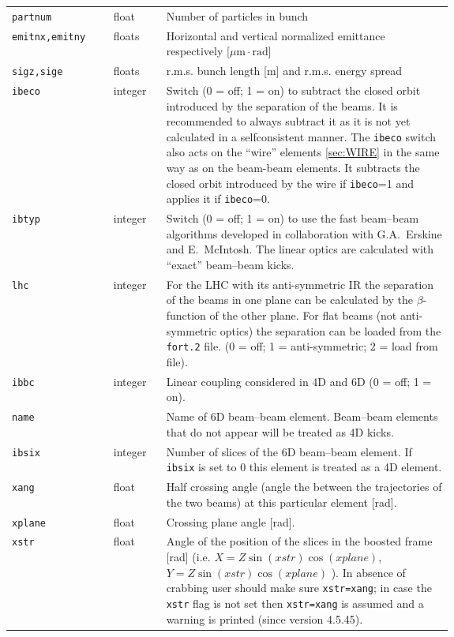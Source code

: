 \bigskip
\begin{longtabu}{@{}llp{0.65\linewidth}}
    \texttt{partnum}       & float   & Number of particles in bunch \\
    \texttt{emitnx,emitny} & floats  & Horizontal and vertical normalized emittance respectively [$\mu \mbox{m}\cdot\mbox{rad}$] \\
    \texttt{sigz,sige}     & floats  & r.m.s. bunch length [m] and r.m.s. energy spread \\
    \texttt{ibeco}         & integer & Switch (0 = off; 1 = on) to subtract the closed orbit introduced by the separation of the beams. It is recommended to always subtract it as it is not yet calculated in a selfconsistent manner. The \texttt{ibeco} switch also acts on the ``wire'' elements \ref{sec:WIRE} in the same way as on the beam-beam elements. It subtracts the closed orbit introduced by the wire if \texttt{ibeco}=1 and applies it if \texttt{ibeco}=0. \\
    \texttt{ibtyp}         & integer & Switch (0 = off; 1 = on) to use the fast beam--beam algorithms developed in collaboration with G.A.~Erskine and E.~McIntosh.  The linear optics are calculated with ``exact'' beam--beam kicks. \\
    \texttt{lhc}           & integer & For the LHC with its anti-symmetric IR the separation of the beams in one plane can be calculated by the $\beta$-function of the other plane. For flat beams (not anti-symmetric optics) the separation can be loaded from the \texttt{fort.2} file. (0 = off; 1 = anti-symmetric; 2 = load from file). \\
    \texttt{ibbc}          & integer & Linear coupling considered in 4D and 6D (0 = off; 1 = on). \\
    \texttt{name}          &           & Name of 6D beam--beam element. Beam--beam elements that do not appear will be treated as 4D kicks. \\
    \texttt{ibsix}         & integer & Number of slices of the 6D beam--beam element. If \texttt{ibsix} is set to 0 this element is treated as a 4D element. \\
    \texttt{xang}          & float   & Half crossing angle (angle the between the trajectories of the two beams) at this particular element [rad]. \\
    \texttt{xplane}        & float   & Crossing plane angle [rad]. \\
    \texttt{xstr}          & float   & Angle of the position of the slices in the boosted frame [rad] (i.e. $X = Z \sin(\mathit{xstr}) \cos(\mathit{xplane})$, $Y =Z \sin(\mathit{xstr}) \cos(\mathit{xplane})$ ).  In absence of crabbing user should make sure \texttt{xstr=xang}; in case the \texttt{xstr} flag is not set then \texttt{xstr=xang} is assumed and a warning is printed (since version 4.5.45).
\end{longtabu}

